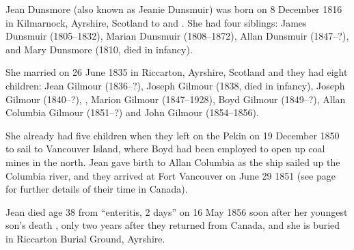 
Jean Dunsmore (also known as Jeanie Dunsmuir) was born on 8 December 1816 in Kilmarnock, Ayrshire, Scotland to  and .
She had four siblings:  James Dunsmuir (1805--1832), Marian Dunsmuir (1808--1872), Allan Dunsmuir (1847--?), and Mary Dunsmore (1810, died in infancy).

She married  on 26 June 1835 in Riccarton, Ayrshire, Scotland\cite{JeanDunsmoreMarraige} and they had eight children:
Jean Gilmour (1836--?), Joseph Gilmour (1838, died in infancy), Joseph Gilmour (1840--?), ,
Marion Gilmour (1847--1928), Boyd Gilmour (1849--?), Allan Columbia Gilmour (1851--?) and John Gilmour (1854--1856).

She already had five children when they left on the Pekin on 19 December 1850 to sail to Vancouver Island, where Boyd had been employed to open up coal mines in the north. Jean gave birth to Allan Columbia as the ship sailed up the Columbia river, and they arrived at Fort Vancouver on June 29 1851 (see page \pageref{Boyd_Gilmour} for further details of their time in Canada).

Jean died age 38 from ``enteritis, 2 days'' on 16 May 1856 soon after her youngest son's death \cite{JeanDunsmoreDeath}, only two years after they returned from Canada, and she is buried in Riccarton Burial Ground, Ayrshire.

